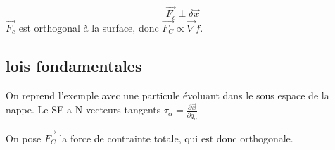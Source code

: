 \documentclass[french]{yLectureNote}
\renewcommand{\vec}{\overrightarrow}
\begin{document}
\begin{proposition}
    $$\vec{F_c}\perp \delta \vec{x}$$ $\vec{F_c}$ est orthogonal à la surface, donc $\vec{F_C}\propto \vec{\nabla}f$.
\end{proposition}
\subsection{lois fondamentales}
On reprend l'exemple avec une particule évoluant dans le sous espace de la nappe. Le SE a N vecteurs tangents $\tau_{\alpha} = \frac{\partial \vec{x}}{\partial q_{\alpha}}$

On pose $\vec{F_C}$ la force de contrainte totale, qui est donc orthogonale.
\end{document}
